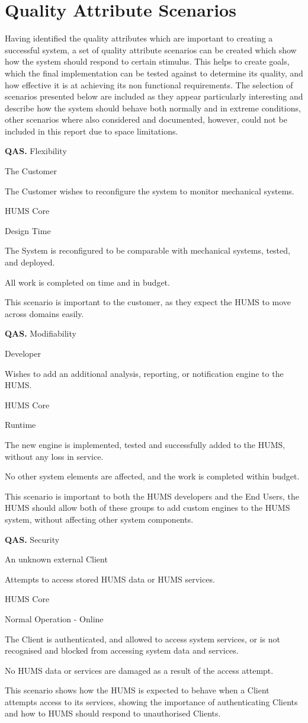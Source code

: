 \documentclass[10pt,a4paper]{article}
\newcommand{\qas}[1]{\textcolor{reqColor}{\textbf{QAS.#1}}}
\newenvironment{scenario}[1]{
\newcommand{\source}[1]{\item[Source of Stimulus:] ##1}
\newcommand{\stimulus}[1]{\item[Stimulus:] ##1}
\newcommand{\artifact}[1]{\item[Artifact:] ##1}
\newcommand{\environment}[1]{\item[Environment:] ##1}
\newcommand{\response}[1]{\item[Response:] ##1}
\newcommand{\measure}[1]{\item[Response Measure:] ##1}
\newcommand{\rationale}[1]{\item[Scenario Rationale:] ##1}
\newcommand{\quality}[1]{\item[Quality:] ##1}
		\begin{description} [noitemsep]	
		\item[Scenario ID:] \qas{#1}
		}{\end{description} \vspace*{0.3cm}
		}
\begin{document}
\section{Quality Attribute Scenarios}
\label{sec:scenarios}
Having identified the quality attributes which are important to creating a successful system, a set of quality attribute scenarios can be created which show how the system should respond to certain stimulus. This helps to create goals, which the final implementation can be tested against to determine its quality, and how effective it is at achieving its non functional requirements. The selection of scenarios presented below are included as they appear particularly interesting and describe how the system should behave both normally and in extreme conditions, other scenarios where also considered and documented, however, could not be included in this report due to space limitations.

\begin{scenario}{1}
\quality{Flexibility}
\source{The Customer}
\stimulus{The Customer wishes to reconfigure the system to monitor mechanical systems.}
\artifact{HUMS Core}
\environment{Design Time}
\response{The System is reconfigured to be comparable with mechanical systems, tested, and deployed.}
\measure{All work is completed on time and in budget.}
\rationale{This scenario is important to the customer, as they expect the HUMS to move across domains easily.}
\end{scenario}

\begin{scenario}{2}
\quality{Modifiability}
\source{Developer}
\stimulus{Wishes to add an additional analysis, reporting, or notification engine to the HUMS.}
\artifact{HUMS Core}
\environment{Runtime}
\response{The new engine is implemented, tested and successfully added to the HUMS, without any loss in service.}
\measure{No other system elements are affected, and the work is completed within budget.}
\rationale{This scenario is important to both the HUMS developers and the End Users, the HUMS should allow both of these groups to add custom engines to the HUMS system, without affecting other system components.}
\end{scenario}

\begin{scenario}{3}
\quality{Security}
\source{An unknown external Client}
\stimulus{Attempts to access stored HUMS data or HUMS services.}
\artifact{HUMS Core}
\environment{Normal Operation - Online}
\response{The Client is authenticated, and allowed to access system services, or is not recognised and blocked from accessing system data and services.}
\measure{No HUMS data or services are damaged as a result of the access attempt.}
\rationale{This scenario shows how the HUMS is expected to behave when a Client attempts access to its services, showing the importance of authenticating Clients and how to HUMS should respond to unauthorised Clients.}
\end{scenario}
\end{document}
